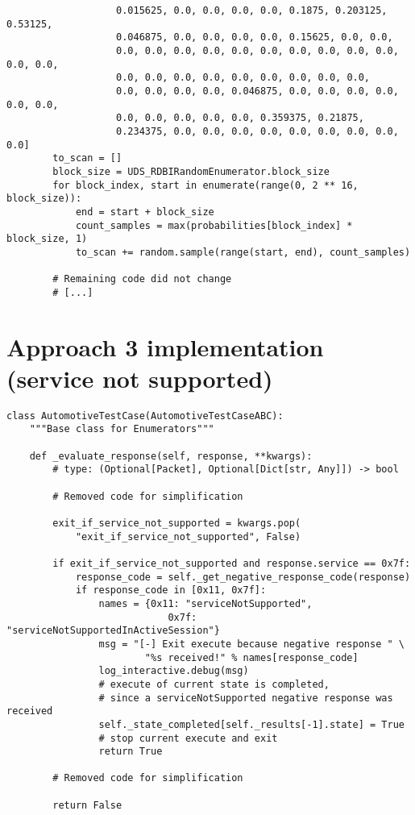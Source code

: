 \begin{verbatim}
                   0.015625, 0.0, 0.0, 0.0, 0.0, 0.1875, 0.203125, 0.53125,
                   0.046875, 0.0, 0.0, 0.0, 0.0, 0.15625, 0.0, 0.0,
                   0.0, 0.0, 0.0, 0.0, 0.0, 0.0, 0.0, 0.0, 0.0, 0.0, 0.0, 0.0,
                   0.0, 0.0, 0.0, 0.0, 0.0, 0.0, 0.0, 0.0, 0.0,
                   0.0, 0.0, 0.0, 0.0, 0.046875, 0.0, 0.0, 0.0, 0.0, 0.0, 0.0,
                   0.0, 0.0, 0.0, 0.0, 0.0, 0.359375, 0.21875,
                   0.234375, 0.0, 0.0, 0.0, 0.0, 0.0, 0.0, 0.0, 0.0, 0.0]
        to_scan = []
        block_size = UDS_RDBIRandomEnumerator.block_size
        for block_index, start in enumerate(range(0, 2 ** 16, block_size)):
            end = start + block_size
            count_samples = max(probabilities[block_index] * block_size, 1)
            to_scan += random.sample(range(start, end), count_samples)

        # Remaining code did not change
        # [...]
\end{verbatim}


\section{Approach 3 implementation (service not supported)}

\begin{verbatim}
class AutomotiveTestCase(AutomotiveTestCaseABC):
    """Base class for Enumerators"""

    def _evaluate_response(self, response, **kwargs):
        # type: (Optional[Packet], Optional[Dict[str, Any]]) -> bool

        # Removed code for simplification

        exit_if_service_not_supported = kwargs.pop(
            "exit_if_service_not_supported", False)

        if exit_if_service_not_supported and response.service == 0x7f:
            response_code = self._get_negative_response_code(response)
            if response_code in [0x11, 0x7f]:
                names = {0x11: "serviceNotSupported",
                            0x7f: "serviceNotSupportedInActiveSession"}
                msg = "[-] Exit execute because negative response " \
                        "%s received!" % names[response_code]
                log_interactive.debug(msg)
                # execute of current state is completed,
                # since a serviceNotSupported negative response was received
                self._state_completed[self._results[-1].state] = True
                # stop current execute and exit
                return True

        # Removed code for simplification

        return False
\end{verbatim}
